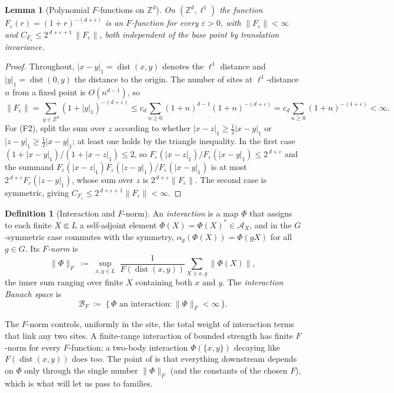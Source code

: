 \documentclass[12pt]{article}
\newcommand{\Ffun}{F}                          %
\newcommand{\BF}{\mathcal{B}_{F}}              %
\newcommand{\qA}{\mathcal{A}}
\newcommand{\norm}[1]{\lVert #1\rVert}
\newcommand{\Fnorm}[1]{\lVert #1\rVert_{F}}
\newcommand{\dist}{\operatorname{dist}}
\newcommand{\Z}{\mathbb{Z}}
\newcommand{\eqdef}{\coloneqq}
\newtheorem{lemma}[theorem]{Lemma}
\theoremstyle{definition}
\newtheorem{definition}[theorem]{Definition}
\theoremstyle{remark}
\begin{document}
\begin{lemma}[Polynomial $\Ffun$-functions on $\Z^d$]
\label{lem:zd-Ffun}
On $(\Z^d,\ell^1)$ the function $\Ffun_\varepsilon(r)=(1+r)^{-(d+\varepsilon)}$ is an
$\Ffun$-function for every $\varepsilon>0$, with $\norm{\Ffun_\varepsilon}<\infty$ and
$C_{\Ffun_\varepsilon}\le 2^{\,d+\varepsilon+1}\,\norm{\Ffun_\varepsilon}$, both independent of
the base point by translation invariance.
\end{lemma}
\begin{proof}
Throughout, $\lvert x-y\rvert_1=\dist(x,y)$ denotes the $\ell^1$ distance and
$\lvert y\rvert_1=\dist(0,y)$ the distance to the origin.
The number of sites at $\ell^1$-distance $n$ from a fixed point is $O(n^{d-1})$, so
\[
  \norm{\Ffun_\varepsilon}=\sum_{y\in\Z^d}(1+\lvert y\rvert_1)^{-(d+\varepsilon)}
  \le c_d\sum_{n\ge 0}(1+n)^{d-1}(1+n)^{-(d+\varepsilon)}
  = c_d\sum_{n\ge 0}(1+n)^{-(1+\varepsilon)}<\infty .
\]
For (F2), split the sum over $z$ according to whether $\lvert x-z\rvert_1\ge\tfrac12\lvert
x-y\rvert_1$ or $\lvert z-y\rvert_1\ge\tfrac12\lvert x-y\rvert_1$; at least one holds by the
triangle inequality. In the first case $(1+\lvert x-y\rvert_1)/(1+\lvert x-z\rvert_1)\le 2$, so
$\Ffun_\varepsilon(\lvert x-z\rvert_1)/\Ffun_\varepsilon(\lvert x-y\rvert_1)\le
2^{\,d+\varepsilon}$ and the summand $\Ffun_\varepsilon(\lvert x-z\rvert_1)\Ffun_\varepsilon
(\lvert z-y\rvert_1)/\Ffun_\varepsilon(\lvert x-y\rvert_1)$ is at most
$2^{\,d+\varepsilon}\Ffun_\varepsilon(\lvert z-y\rvert_1)$, whose sum over $z$ is
$2^{\,d+\varepsilon}\norm{\Ffun_\varepsilon}$. The second case is symmetric, giving
$C_{\Ffun_\varepsilon}\le 2^{\,d+\varepsilon+1}\norm{\Ffun_\varepsilon}<\infty$.
\end{proof}

\begin{definition}[Interaction and $\Ffun$-norm]
\label{def:interaction}
An \emph{interaction} is a map $\Phi$ that assigns to each finite $X\Subset L$ a
self-adjoint element $\Phi(X)=\Phi(X)^*\in\qA_X$, and in the $G$-symmetric case commutes with
the symmetry, $\alpha_g(\Phi(X))=\Phi(gX)$ for all $g\in G$. Its \emph{$\Ffun$-norm} is
\[
  \Fnorm{\Phi}\;\eqdef\;\sup_{x,y\in L}\;\frac{1}{\Ffun(\dist(x,y))}
    \sum_{X\ni x,y}\norm{\Phi(X)},
\]
the inner sum ranging over finite $X$ containing both $x$ and $y$. The
\emph{interaction Banach space} is
\[
  \BF\;\eqdef\;\bigl\{\,\Phi \text{ an interaction} : \Fnorm{\Phi}<\infty\,\bigr\}.
\]
\end{definition}

The $\Ffun$-norm controls, uniformly in the site, the total weight of interaction terms that
link any two sites. A finite-range interaction of bounded strength has finite $\Ffun$-norm
for every $\Ffun$-function; a two-body interaction $\Phi(\{x,y\})$ decaying like
$\Ffun(\dist(x,y))$ does too. The point of  is that everything downstream
depends on $\Phi$ only through the single number $\Fnorm{\Phi}$ (and the constants of the
chosen $\Ffun$), which is what will let us pass to families.
\end{document}
